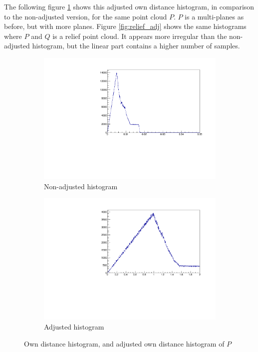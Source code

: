 The following figure \ref{fig:disks_adj} shows this adjusted own distance histogram, in comparison to the non-adjusted version, for the same point cloud $P$. $P$ is a multi-planes as before, but with more planes. Figure \ref{fig:relief_adj} shows the same histograms where $P$ and $Q$ is a relief point cloud. It appears more irregular than the non-adjusted histogram, but the linear part contains a higher number of samples.
\begin{figure}[H]
\begin{subfigure}{.5\textwidth}
	\includegraphics[width=\linewidth]{fig/disks_noadj.pdf}
	\caption{Non-adjusted histogram}
\end{subfigure}%
\begin{subfigure}{.5\textwidth}
	\includegraphics[width=\linewidth]{fig/disks_adj.pdf}
	\caption{Adjusted histogram}
\end{subfigure}
\caption{Own distance histogram, and adjusted own distance histogram of $P$}
\label{fig:disks_adj}
\end{figure}


